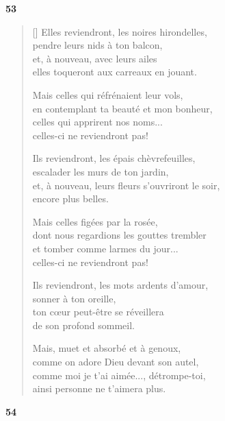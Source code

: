 \documentclass[a4paper,12pt]{book}
\begin{document}
\bigskip

\begin{center}
  \textbf{53}
\end{center}

\settowidth{\versewidth}{et, à nouveau, leurs fleurs s'ouvriront le soir,}

\begin{verse}[\versewidth]
  Elles reviendront, les noires hirondelles, \\
  pendre leurs nids à ton balcon, \\
  et, à nouveau, avec leurs ailes \\
  elles toqueront aux carreaux en jouant.

  Mais celles qui réfrénaient leur vols, \\
  en contemplant ta beauté et mon bonheur, \\
  celles qui apprirent nos noms... \\
  celles-ci ne reviendront pas!

  Ils reviendront, les épais chèvrefeuilles, \\
  escalader les murs de ton jardin, \\
  et, à nouveau, leurs fleurs s'ouvriront le soir, \\
  encore plus belles.

  Mais celles figées par la rosée, \\
  dont nous regardions les gouttes trembler \\
  et tomber comme larmes du jour... \\
  celles-ci ne reviendront pas!

  Ils reviendront, les mots ardents d'amour, \\
  sonner à ton oreille, \\
  ton cœur peut-être se réveillera \\
  de son profond sommeil.

  Mais, muet et absorbé et à genoux, \\
  comme on adore Dieu devant son autel, \\
  comme moi je t'ai aimée..., détrompe-toi, \\
  ainsi personne ne t'aimera plus.
\end{verse}

\bigskip

\begin{center}
  \textbf{54}
\end{center}
\end{document}
